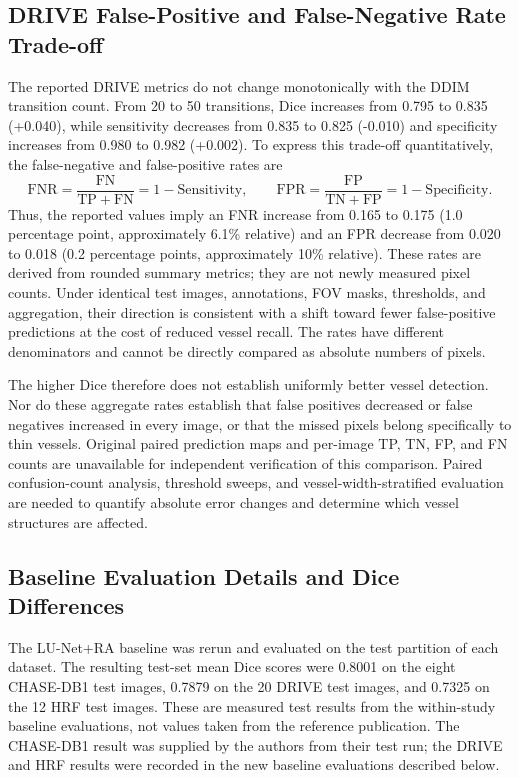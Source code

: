 \documentclass[jimaging,article,submit,pdftex,moreauthors]
  {Definitions/mdpi}
\begin{document}
\subsection{DRIVE False-Positive and False-Negative Rate Trade-off}

The reported DRIVE metrics do not change monotonically with the DDIM transition count. From 20 to 50 transitions, Dice increases from 0.795 to 0.835 (+0.040), while sensitivity decreases from 0.835 to 0.825 (-0.010) and specificity increases from 0.980 to 0.982 (+0.002). To express this trade-off quantitatively, the false-negative and false-positive rates are
\begin{equation}
\mathrm{FNR}=\frac{\mathrm{FN}}{\mathrm{TP}+\mathrm{FN}}=1-\mathrm{Sensitivity},\qquad
\mathrm{FPR}=\frac{\mathrm{FP}}{\mathrm{TN}+\mathrm{FP}}=1-\mathrm{Specificity}.
\end{equation}
Thus, the reported values imply an FNR increase from 0.165 to 0.175 (1.0 percentage point, approximately 6.1\% relative) and an FPR decrease from 0.020 to 0.018 (0.2 percentage points, approximately 10\% relative). These rates are derived from rounded summary metrics; they are not newly measured pixel counts. Under identical test images, annotations, FOV masks, thresholds, and aggregation, their direction is consistent with a shift toward fewer false-positive predictions at the cost of reduced vessel recall. The rates have different denominators and cannot be directly compared as absolute numbers of pixels.

The higher Dice therefore does not establish uniformly better vessel detection. Nor do these aggregate rates establish that false positives decreased or false negatives increased in every image, or that the missed pixels belong specifically to thin vessels. Original paired prediction maps and per-image TP, TN, FP, and FN counts are unavailable for independent verification of this comparison. Paired confusion-count analysis, threshold sweeps, and vessel-width-stratified evaluation are needed to quantify absolute error changes and determine which vessel structures are affected.

\subsection{Baseline Evaluation Details and Dice Differences}

The LU-Net+RA baseline was rerun and evaluated on the test partition of each dataset. The resulting test-set mean Dice scores were 0.8001 on the eight CHASE-DB1 test images, 0.7879 on the 20 DRIVE test images, and 0.7325 on the 12 HRF test images. These are measured test results from the within-study baseline evaluations, not values taken from the reference publication. The CHASE-DB1 result was supplied by the authors from their test run; the DRIVE and HRF results were recorded in the new baseline evaluations described below.
\end{document}

